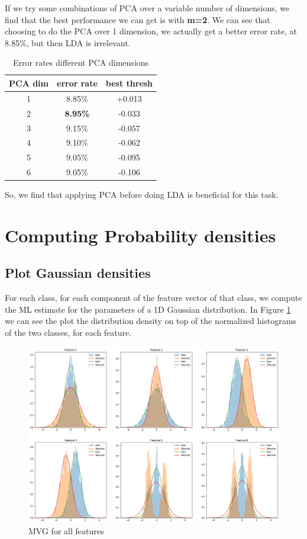 \documentclass[12pt, a4paper]{article}
\begin{document}
If we try some combinations of PCA over a variable number of dimensions, we find that the best performance we can get is with \textbf{m=2}. We can see that choosing to do the PCA over 1 dimension, we actually get a better error rate, at 8.85\%, but then LDA is irrelevant.

\begin{table}[ht!]
	\centering
 	\begin{tabular}{| | c c c | |} 
 		\hline
 		PCA dim & error rate & best thresh\\
 		\hline\hline
 		1 & 8.85\% & +0.013\\
 		\hline
 		2 & \textbf{8.95\%} & -0.033\\
 		\hline
 		3 & 9.15\% & -0.057\\
 		\hline
 		4 & 9.10\% & -0.062\\
 		\hline
 		5 & 9.05\% & -0.095\\
 		\hline
 		6 & 9.05\% & -0.106\\
 		\hline
 	\end{tabular}
	\caption{Error rates different PCA dimensions}
\end{table}

\hfill \break
\noindent So, we find that applying PCA before doing LDA is beneficial for this task.

\clearpage
\section{Computing Probability densities}
\subsection{Plot Gaussian densities}

For each class, for each component of the feature vector of that class, we compute the ML estimate for the parameters of a 1D Gaussian distribution. In Figure \ref{fig:MVG_6_features} we can see the plot the distribution density on top of the normalized histograms of the two classes, for each feature.

\begin{figure}[ht]
	\centering
	\includegraphics[width=.9\textwidth]{MVG_6_features}
	\caption{MVG for all features}
	\label{fig:MVG_6_features}
\end{figure}
\end{document}
